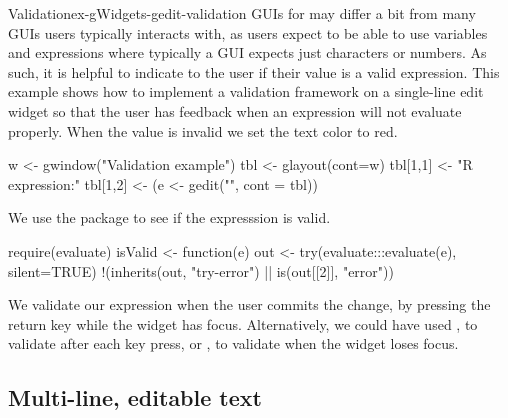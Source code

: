 \begin{example}{Validation}{ex-gWidgets-gedit-validation}
GUIs for \R\/ may differ a bit from many GUIs users typically
interacts with, as \R\/ users expect to be able to use variables and
expressions where typically a GUI expects just characters or
numbers. As such, it is helpful to indicate to the user if their value
is a valid expression. This example shows how to implement a
validation framework on a single-line edit widget so that the user has
feedback when an expression will not evaluate properly.  When the
value is invalid we set the text color to red.


\begin{Schunk}
\begin{Sinput}
 w <- gwindow("Validation example")
 tbl <- glayout(cont=w)
 tbl[1,1] <- "R expression:"
 tbl[1,2] <- (e <- gedit("", cont = tbl))
\end{Sinput}
\end{Schunk}


We use the  package to see if the expresssion is valid.
\begin{Schunk}
\begin{Sinput}
 require(evaluate)
 isValid <- function(e) {
   out <- try(evaluate:::evaluate(e), silent=TRUE)
   !(inherits(out, "try-error") || 
     is(out[[2]], "error"))
 }
\end{Sinput}
\end{Schunk}
%

We validate our expression when the user commits the change, by
pressing the return key while the widget has focus. Alternatively, we
could have used
, to validate after each key press, or
, to validate when the widget loses focus.

\begin{Schunk}
\end{Schunk}

\end{example}

\subsection{Multi-line, editable text}
\label{sec:gWidgets-multi-line-editable}

